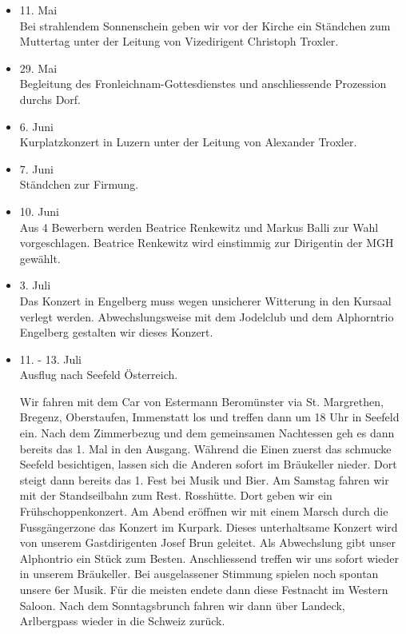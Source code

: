 \begin{history}
\begin{itemize}
        \item 11. Mai\\
              Bei strahlendem Sonnenschein geben wir vor der Kirche ein Ständchen zum
              Muttertag unter der Leitung von Vizedirigent Christoph Troxler.

        \item 29. Mai\\
              Begleitung des Fronleichnam-Gottesdienstes und anschliessende Prozession
              durchs Dorf.

        \item 6. Juni\\
              Kurplatzkonzert in Luzern unter der Leitung von Alexander Troxler.

        \item 7. Juni\\
              Ständchen zur Firmung.

        \item 10. Juni\\
              Aus 4 Bewerbern werden Beatrice Renkewitz und Markus Balli zur Wahl
              vorgeschlagen. Beatrice Renkewitz wird einstimmig zur Dirigentin der MGH
              gewählt.

        \item 3. Juli\\
              Das Konzert in Engelberg muss wegen unsicherer Witterung in den Kursaal
              verlegt werden. Abwechslungsweise mit dem Jodelclub und dem Alphorntrio
              Engelberg gestalten wir dieses Konzert.

        \item 11. - 13. Juli\\
              Ausflug nach Seefeld Österreich.

              Wir fahren mit dem Car von Estermann
              Beromünster via St. Margrethen, Bregenz, Oberstaufen, Immenstatt los und
              treffen dann um 18 Uhr in Seefeld ein. Nach dem Zimmerbezug und dem
              gemeinsamen Nachtessen geh es dann bereits das 1. Mal in den Ausgang.
              Während die Einen zuerst das schmucke Seefeld besichtigen, lassen sich
              die Anderen sofort im Bräukeller nieder. Dort steigt dann bereits das 1.
              Fest bei Musik und Bier. Am Samstag fahren wir mit der Standseilbahn zum
              Rest. Rosshütte. Dort geben wir ein Frühschoppenkonzert. Am Abend
              eröffnen wir mit einem Marsch durch die Fussgängerzone das Konzert im
              Kurpark. Dieses unterhaltsame Konzert wird von unserem Gastdirigenten
              Josef Brun geleitet. Als Abwechslung gibt unser Alphontrio ein Stück zum
              Besten. Anschliessend treffen wir uns sofort wieder in unserem
              Bräukeller. Bei ausgelassener Stimmung spielen noch spontan unsere 6er
              Musik. Für die meisten endete dann diese Festnacht im Western Saloon.
              Nach dem Sonntagsbrunch fahren wir dann über Landeck, Arlbergpass wieder
              in die Schweiz zurück.


\end{itemize}
\end{history}
